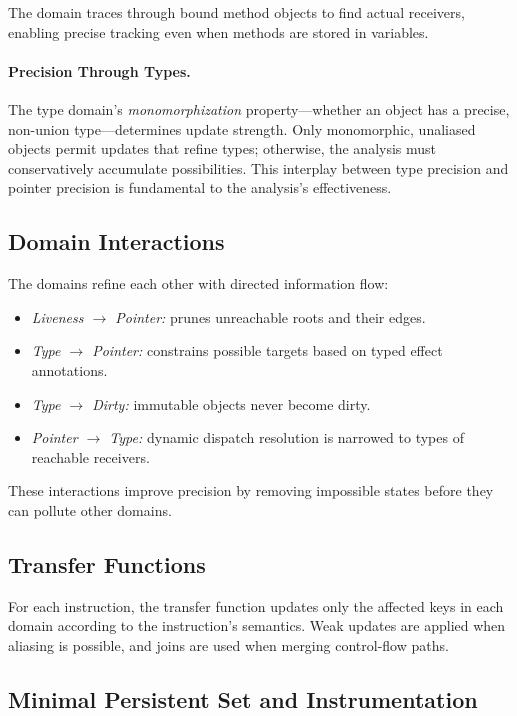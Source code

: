The domain traces through bound method objects to find actual receivers, enabling precise tracking even when methods are stored in variables.

\paragraph{Precision Through Types.}
The type domain's \emph{monomorphization} property---whether an object has a precise, non-union type---determines update strength. Only monomorphic, unaliased objects permit updates that refine types; otherwise, the analysis must conservatively accumulate possibilities. This interplay between type precision and pointer precision is fundamental to the analysis's effectiveness.

\subsection{Domain Interactions}
The domains refine each other with directed information flow:
\begin{itemize}
    \item \emph{Liveness $\rightarrow$ Pointer:} prunes unreachable roots and their edges.
    \item \emph{Type $\rightarrow$ Pointer:} constrains possible targets based on typed effect annotations.
    \item \emph{Type $\rightarrow$ Dirty:} immutable objects never become dirty.
    \item \emph{Pointer $\rightarrow$ Type:} dynamic dispatch resolution is narrowed to types of reachable receivers.
\end{itemize}
These interactions improve precision by removing impossible states before they can pollute other domains.

\subsection{Transfer Functions}
For each instruction, the transfer function updates only the affected keys in each domain according to the instruction's semantics. Weak updates are applied when aliasing is possible, and joins are used when merging control-flow paths.


\subsection{Minimal Persistent Set and Instrumentation}
\label{sec:min-persist}

